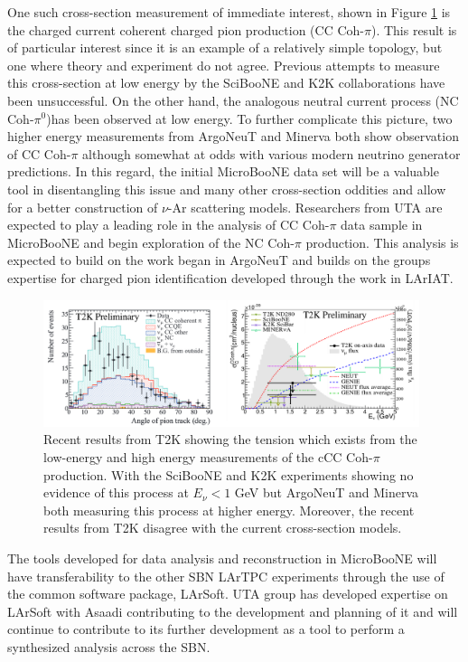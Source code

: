 One such cross-section measurement of immediate interest, shown in Figure \ref{fig:cccohpion} is the charged current coherent charged pion production (CC Coh-$\pi$). This result is of particular interest since it is an example of a relatively simple topology, but one where theory and experiment do not agree. Previous attempts to measure this cross-section at low energy by the SciBooNE and K2K collaborations have been unsuccessful. On the other hand, the analogous neutral current process (NC Coh-$\pi^{0}$)has been observed at low energy. To further complicate this picture, two higher energy measurements from ArgoNeuT and Minerva both show observation of CC Coh-$\pi$ although somewhat at odds with various modern neutrino generator predictions. In this regard, the initial MicroBooNE data set will be a valuable tool in disentangling this issue and many other cross-section oddities and allow for a better construction of $\nu$-Ar scattering models. Researchers from UTA are expected to play a leading role in the analysis of CC Coh-$\pi$ data sample in MicroBooNE and begin exploration of the NC Coh-$\pi$ production. This analysis is expected to build on the work began in ArgoNeuT \cite{Argoneut} and builds on the groups expertise for charged pion identification developed through the work in LArIAT.
 
\begin{figure}[htb]
\centering
\includegraphics[width=0.98\textwidth]{images/CCCohPion.png}
\caption[]{Recent results from T2K \cite{T2K} showing the tension which exists from the low-energy and high energy measurements of the cCC Coh-$\pi$ production. With the SciBooNE and K2K experiments showing no evidence of this process at $E_{\nu} < 1$ GeV but ArgoNeuT and Minerva both measuring this process at higher energy. Moreover, the recent results from T2K disagree with the current cross-section models.}
\label{fig:cccohpion}
\end{figure}


The tools developed for data analysis and reconstruction in MicroBooNE will have transferability to the other SBN LArTPC experiments through the use of the common software package, LArSoft. UTA group has developed expertise on LArSoft with Asaadi contributing to the development and planning of it and will continue to contribute to its further development as a tool to perform a synthesized analysis across the SBN.
